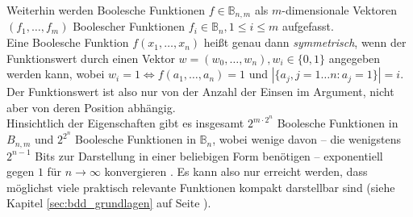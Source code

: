Weiterhin werden Boolesche Funktionen $f \in \mathbb{B}_{n,m}$ als $m$-dimensionale Vektoren \\$(f_1, \dots, f_m)$ Boolescher Funktionen $f_i \in \mathbb{B}_n, 1 \leq i \leq m$ aufgefasst.\\
Eine Boolesche Funktion $f(x_1, \dots, x_n)$ heißt genau dann \emph{symmetrisch}, wenn der Funktionswert durch einen Vektor $w = (w_0, \dots, w_n), w_i \in \{ 0,1 \}$ angegeben werden kann, wobei $w_i = 1 \Leftrightarrow f(a_1, \dots, a_n) = 1$ und $|\{a_j, j =1 \dots n : a_j = 1 \}| = i$. Der Funktionswert ist also nur von der Anzahl der Einsen im Argument, nicht aber von deren Position abhängig.\\
Hinsichtlich der Eigenschaften gibt es insgesamt $2^{m \cdot 2^n}$ Boolesche Funktionen in $B_{n,m}$ und $2^{2^n}$ Boolesche Funktionen in $\mathbb{B}_n$, wobei wenige davon -- die wenigstens $2^{n-1}$ Bits zur Darstellung in einer beliebigen Form benötigen -- exponentiell gegen $1$ für $n \rightarrow \infty$ konvergieren \cite[S.17]{h2002}. Es kann also nur erreicht werden, dass möglichst viele praktisch relevante Funktionen kompakt darstellbar sind (siehe Kapitel \ref{sec:bdd_grundlagen} auf Seite \pageref{sec:bdd_grundlagen}).
